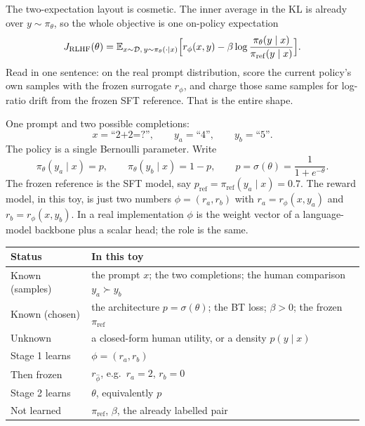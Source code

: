 \documentclass[11pt,a4paper]{article}
\theoremstyle{definition}
\begin{document}
\begin{remark}
The two-expectation layout is cosmetic. The inner average in the KL is already over
$y\sim\pi_\theta$, so the whole objective is one on-policy expectation
\[
J_{\mathrm{RLHF}}(\theta)
=\mathbb{E}_{x\sim\mathcal{D},\,y\sim\pi_\theta(\cdot\mid x)}
\Bigl[
r_\phi(x,y)
-\beta\log\frac{\pi_\theta(y\mid x)}{\pi_{\mathrm{ref}}(y\mid x)}
\Bigr].
\]
Read in one sentence: on the real prompt distribution, score the current policy's
own samples with the frozen surrogate $r_\phi$, and charge those same samples for
log-ratio drift from the frozen SFT reference. That is the entire shape.
\end{remark}

\begin{example}
\label{ex:rlhf-toy}
One prompt and two possible completions:
\[
x=\text{``2+2=?''},
\qquad
y_a=\text{``4''},
\qquad
y_b=\text{``5''}.
\]
The policy is a single Bernoulli parameter. Write
\[
\pi_\theta(y_a\mid x)=p,
\qquad
\pi_\theta(y_b\mid x)=1-p,
\qquad
p=\sigma(\theta)=\frac{1}{1+e^{-\theta}}.
\]
The frozen reference is the SFT model, say $p_{\mathrm{ref}}=\pi_{\mathrm{ref}}(y_a\mid x)=0.7$. The reward model, in this toy, is just two numbers $\phi=(r_a,r_b)$ with $r_a=r_\phi(x,y_a)$ and $r_b=r_\phi(x,y_b)$. In a real implementation $\phi$ is the weight vector of a language-model backbone plus a scalar head; the role is the same.

\begin{center}
{\footnotesize
\begin{tabularx}{\linewidth}{|p{3.6cm}|X|}
\hline
\textbf{Status} & \textbf{In this toy} \\ \hline
Known (samples) & the prompt \(x\); the two completions; the human comparison \(y_a\succ y_b\) \\ \hline
Known (chosen) & the architecture \(p=\sigma(\theta)\); the BT loss; \(\beta>0\); the frozen \(\pi_{\mathrm{ref}}\) \\ \hline
Unknown & a closed-form human utility, or a density \(p(y\mid x)\) \\ \hline
Stage 1 learns & \(\phi=(r_a,r_b)\) \\ \hline
Then frozen & \(r_{\widehat\phi}\), e.g.\ \(r_a=2\), \(r_b=0\) \\ \hline
Stage 2 learns & \(\theta\), equivalently \(p\) \\ \hline
Not learned & \(\pi_{\mathrm{ref}}\), \(\beta\), the already labelled pair \\ \hline
\end{tabularx}
}
\end{center}


\end{example}
\end{document}
